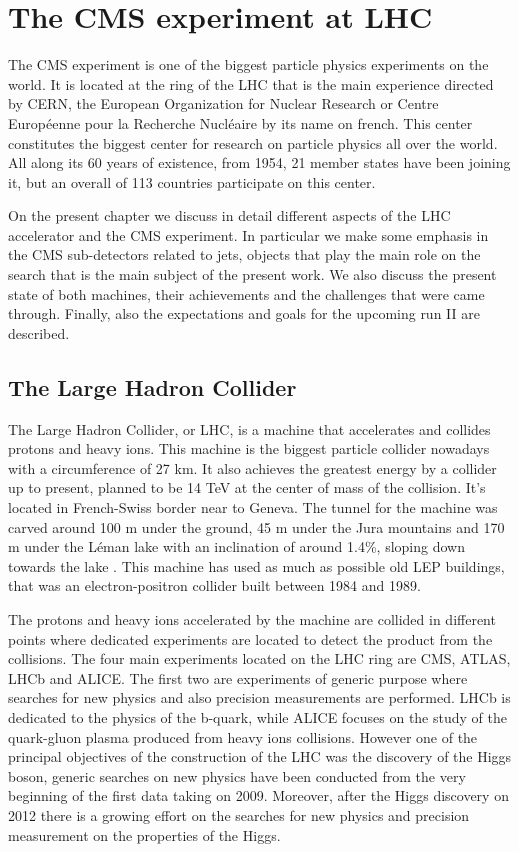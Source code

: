 \chapter[The CMS experiment at LHC]{The CMS experiment at LHC}

The CMS experiment is one of the biggest particle physics experiments on the world. It is located at the ring of the LHC that is the main experience directed by CERN, the European Organization for Nuclear Research or Centre Europ\'{e}enne pour la Recherche Nucl\'{e}aire by its name on french. This center constitutes the biggest center for research on particle physics all over the world. All along its 60 years of existence, from 1954, 21 member states have been joining it, but an overall of 113 countries participate on this center. 

On the present chapter we discuss in detail different aspects of the LHC accelerator and the CMS experiment. In particular we make some emphasis in the CMS sub-detectors related to jets, objects that play the main role on the search that is the main subject of the present work. We also discuss the present state of both machines, their achievements and the challenges that were came through. Finally, also the expectations and goals for the upcoming run II are described.  

\section{The Large Hadron Collider}
\label{sec:LHC}

The Large Hadron Collider, or LHC, is a machine that accelerates and collides protons and heavy ions. This machine is the biggest particle collider nowadays with a circumference of 27 km. It also achieves the greatest energy by a collider up to present, planned to be 14 TeV at the center of mass of the collision. It's located in French-Swiss border near to Geneva. The tunnel for the machine was carved around 100 m under the ground, 45 m under the Jura mountains and 170 m under the L\'{e}man lake with an inclination of around 1.4\%, sloping down towards the lake . This machine has used as much as possible old LEP buildings, that was an electron-positron collider built between 1984 and 1989. 

The protons and heavy ions accelerated by the machine are collided in different points where dedicated experiments are located to detect the product from the collisions. The four main experiments located on the LHC ring are CMS, ATLAS, LHCb and ALICE. The first two are experiments of generic purpose where searches for new physics and also precision measurements are performed. LHCb is dedicated to the physics of the b-quark, while ALICE focuses on the study of the quark-gluon plasma produced from heavy ions collisions. However one of the principal objectives of the construction of the LHC was the discovery of the Higgs boson, generic searches on new physics have been conducted from the very beginning of the first data taking on 2009. Moreover, after the Higgs discovery on 2012 there is a growing effort on the searches for new physics and precision measurement on the properties of the Higgs.


